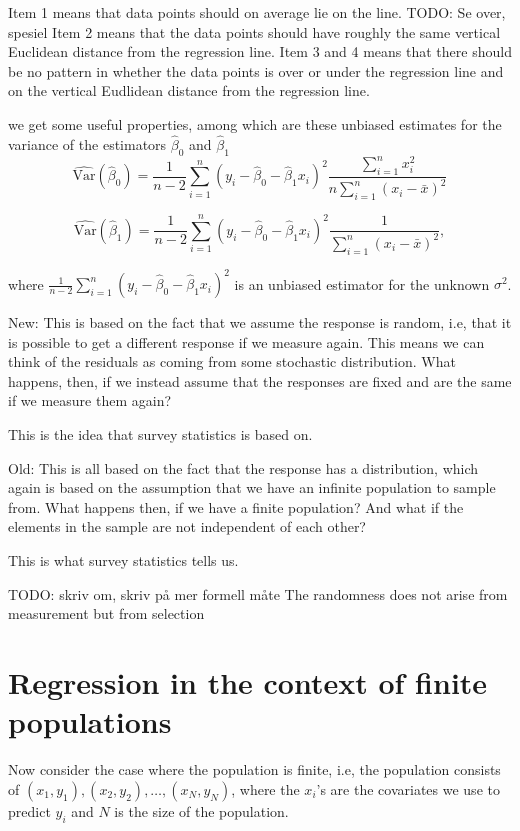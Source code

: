 \documentclass{article}
\begin{document}
Item 1 means that data points should on average lie on the line.
TODO: Se over, spesiel
Item 2 means that the data points should have roughly the same vertical
Euclidean distance from the regression line.
Item 3 and 4 means that there should be no pattern in whether the data points is over
or under the regression line and on the vertical Eudlidean distance from the
regression line.

we get some useful properties, among which are these unbiased estimates for the
variance of the estimators \(\hat{\beta}_0\) and \(\hat{\beta}_1\)
\begin{equation*}
 \widehat{\mathrm{Var}} \left( \hat{\beta}_0 \right) = \frac{1}{n - 2} \sum_{i = 1}^n\left( y_i - \hat{\beta}_0 -
 \hat{\beta}_1 x_i \right)^2 \frac{\sum_{i = 1}^n x_i^2}{n
   \sum_{i = 1}^n \left( x_i - \bar{x} \right)^2}
\end{equation*}
 

\begin{equation*}
 \widehat{\mathrm{Var}} \left( \hat{\beta}_1 \right) = \frac{1}{n - 2} \sum_{i = 1}^n\left( y_i - \hat{\beta}_0 -
 \hat{\beta}_1 x_i \right)^2\frac{1}{
   \sum_{i = 1}^n \left( x_i - \bar{x} \right)^2},
\end{equation*}

where \(\frac{1}{n - 2} \sum_{i = 1}^n\left( y_i - \hat{\beta}_0 -
 \hat{\beta}_1 x_i \right)^2\) is an
unbiased estimator for the unknown \(\sigma^2\).

New: This is based on the fact that we assume the response is random, i.e, that
it is possible to get a different response if we measure again. This means we
can think of the residuals as coming from some stochastic distribution. What
happens, then, if we instead assume that the responses are fixed and are the
same if we measure them again?

This is the idea that survey statistics is based on.

Old: This is all based on the fact that the response has a distribution, which again
is based on the assumption that we have an infinite population to sample from.
What happens then, if we have a finite population? And what if the elements in
the sample are not independent of each other?

This is what survey statistics tells us.

TODO: skriv om, skriv på mer formell måte
The randomness does not arise from measurement but from selection


\section{Regression in the context of finite populations}
Now consider the case where the population is finite, i.e, the population
consists of \((x_1, y_1),
(x_2, y_2), \dots , (x_N, y_N)\), where the \(x_i\)'s are the covariates we use to
predict \(y_i\) and \(N\) is the size of the population.
\end{document}
